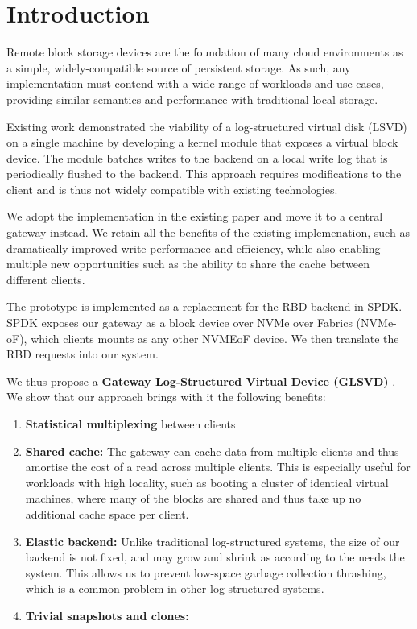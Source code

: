 \section{Introduction}

Remote block storage devices are the foundation of many cloud environments as
a simple, widely-compatible source of persistent storage. As such, any
implementation must contend with a wide range of workloads and use cases,
providing similar semantics and performance with traditional local storage.

Existing work \cite{lsvd} demonstrated the viability of a log-structured virtual
disk (LSVD) on a single machine by developing a kernel module that exposes a
virtual block device. The module batches writes to the backend on a local write
log that is periodically flushed to the backend.  This approach requires
modifications to the client and is thus not widely compatible with existing
technologies.

We adopt the implementation in the existing paper and move it to a central
gateway instead. We retain all the benefits of the existing implemenation, such
as dramatically improved write performance and efficiency, while also enabling
multiple new opportunities such as the ability to share the cache between
different clients.

The prototype is implemented as a replacement for the RBD backend in SPDK.
SPDK exposes our gateway as a block device over NVMe over Fabrics (NVMe-oF),
which clients mounts as any other NVMEoF device. We then translate the RBD
requests into our system.

We thus propose a \textbf{Gateway Log-Structured Virtual Device (GLSVD)}
. We show that our approach brings with it
the following benefits:


\begin{enumerate}

  \item \textbf{Statistical multiplexing} between clients

  \item \textbf{Shared cache:} The gateway can cache data from multiple clients
        and thus amortise the cost of a read across multiple clients. This is
        especially useful for workloads with high locality, such as booting a cluster
        of identical virtual machines, where many of the blocks are shared and thus
        take up no additional cache space per client.

  \item \textbf{Elastic backend:} Unlike traditional log-structured systems, the
        size of our backend is not fixed, and may grow and shrink as according to the
        needs the system. This allows us to prevent low-space garbage collection
        thrashing, which is a common problem in other log-structured systems.

  \item \textbf{Trivial snapshots and clones:}


\end{enumerate}

